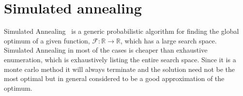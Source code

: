 \section{Simulated annealing}
\label{sec:simulated-annealing}

Simulated Annealing~\cite{skir83} is a generic probabilistic algorithm
for finding the global optimum of a given function,
$\mathcal{F}: \mathbb{R} \rightarrow \mathbb{R}$, which has a large
search space.  Simulated Annealing in most of the cases is cheaper than
exhaustive enumeration, which is exhaustively listing the entire search
space. Since it is a monte carlo method it will always terminate and the
solution need not be the most optimal but in general considered to be a
good approximation of the optimum.






